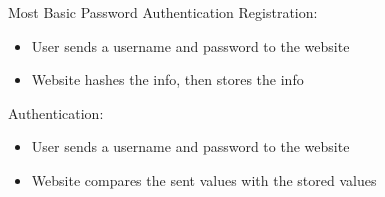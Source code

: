 \documentclass[12pt]{report}
\begin{document}
\begin{exbox}{Most Basic Password Authentication}{}
    Registration:
    \begin{itemize}[noitemsep]
        \item User sends a username and password to the website
        \item Website hashes the info, then stores the info
    \end{itemize}
    Authentication:
    \begin{itemize}[noitemsep]
        \item User sends a username and password to the website
        \item Website compares the sent values with the stored values
    \end{itemize}
\end{exbox}

\amzindex
\end{document}
